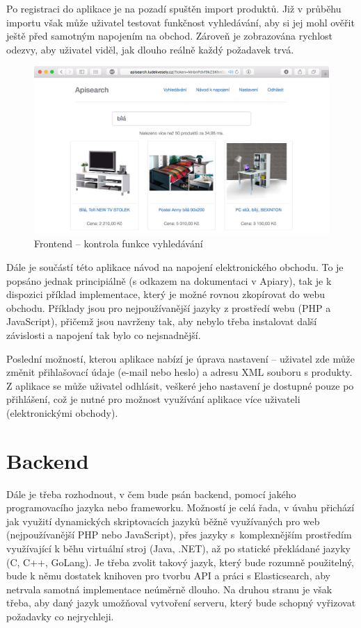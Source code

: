 \documentclass[FM,DP]{tulthesis}
\begin{document}
Po registraci do aplikace je na pozadí spuštěn import produktů. Již v průběhu importu však může uživatel
testovat funkčnost vyhledávání, aby si jej mohl ověřit ještě před samotným napojením na obchod.
Zároveň je zobrazována rychlost odezvy, aby uživatel viděl, jak dlouho reálně každý požadavek trvá.

\begin{figure}[h]
\center
\includegraphics[width=\textwidth]{frontend.png}
\caption{Frontend -- kontrola funkce vyhledávání}
\label{frontend}
\end{figure}

Dále je součástí této aplikace návod na napojení elektronického obchodu. To je popsáno jednak
principiálně (s odkazem na dokumentaci v Apiary), tak je k dispozici příklad implementace, 
který je možné rovnou zkopírovat do webu obchodu. Příklady jsou pro nejpoužívanější jazyky
z prostředí webu (PHP a JavaScript), přičemž jsou navrženy tak, aby nebylo třeba instalovat
další závislosti a napojení tak bylo co nejsnadnější.

Poslední možností, kterou aplikace nabízí je úprava nastavení -- uživatel zde může změnit
přihlašovací údaje (e-mail nebo heslo) a adresu XML souboru s produkty. Z aplikace se může 
uživatel odhlásit, veškeré jeho nastavení je dostupné pouze po přihlášení, což je nutné
pro možnost využívání aplikace více uživateli (elektronickými obchody).

\section{Backend}

Dále je třeba rozhodnout, v čem bude psán backend, pomocí jakého programovacího jazyka
nebo frameworku. Možností je celá řada, v úvahu přichází jak využití dynamických skriptovacích 
jazyků běžně využívaných pro web (nejpoužívanější PHP nebo JavaScript), přes jazyky 
s~komplexnějším prostředím využívající k běhu virtuální stroj (Java, .NET), až po statické 
překládané jazyky (C, C++, GoLang). Je třeba zvolit takový jazyk, který bude rozumně použitelný, 
bude k němu dostatek knihoven pro tvorbu API a práci s Elasticsearch, aby netrvala samotná
implementace neúměrně dlouho. Na druhou stranu je však třeba, aby daný jazyk umožňoval
vytvoření serveru, který bude schopný vyřizovat požadavky co nejrychleji.
\end{document}
